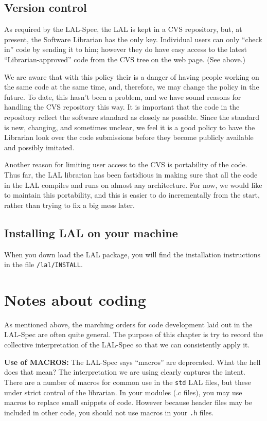 \documentclass[oneside]{book}
\begin{document}
\section{Version control}

As required by the LAL-Spec, the LAL is kept in a CVS repository, but,
at present, the Software Librarian has the only key.  Individual users
can only ``check in'' code by sending it to him; however they do have
easy access to the latest ``Librarian-approved'' code from the CVS
tree on the web page. (See above.)

We are aware that with this policy their is a danger of having people
working on the same code at the same time, and, therefore, we may change 
the policy in the future. To date, this hasn't been a problem, and we
have sound reasons for handling the CVS repository this way.  It is
important that the code in the repository reflect the software
standard as closely as possible.  Since the standard is new, changing,
and sometimes unclear, we feel it is a good policy to have the
Librarian look over the code submissions before they become publicly
available and possibly imitated.

Another reason for limiting user access to the CVS is portability of
the code.  Thus far, the LAL librarian has been fastidious in making
sure that all the code in  the LAL compiles and runs on almost any
architecture.  For now, we would like to maintain this portability,
and this is easier to do incrementally from the start, rather than
trying to fix a big mess later.

\section{Installing LAL on your machine}

When you down load the LAL package, you will find the installation
instructions in the file {\tt /lal/INSTALL}.

\chapter{Notes about coding}
\label{c:CodingNotes}

As mentioned above,  the marching orders for code development laid out
in the LAL-Spec are often quite general.  The purpose of this chapter
is try to record the collective interpretation of the LAL-Spec so that
we can consistently apply it.

\bigskip

{\noindent \bf Use of MACROS:} The LAL-Spec says ``macros'' are
deprecated.  What the hell does that mean? The interpretation we are
using clearly captures the intent.  There are a number of macros for
common use in the {\tt std} LAL files, but these under strict control
of the librarian.  In your modules (.c files), you may use macros to
replace small snippets of code.  However because header files may be
included in other code, you should not use macros in your {\tt .h}
files.
\end{document}
